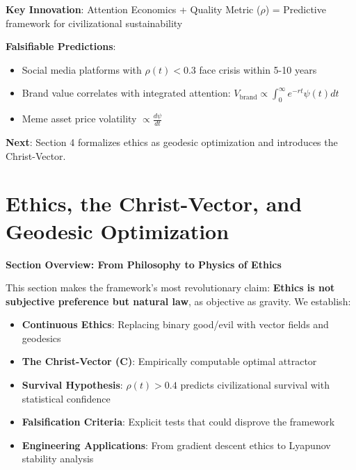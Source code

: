 \documentclass[11pt,a4paper]{article}
\theoremstyle{definition}
\theoremstyle{remark}
\begin{document}
\begin{small}
\begin{mdframed}[backgroundcolor=green!10,linewidth=2pt,linecolor=green!70!black]
\textbf{Key Innovation}:
Attention Economics + Quality Metric (\(\rho\)) = Predictive framework for civilizational sustainability

\textbf{Falsifiable Predictions}:
\begin{itemize}[nosep]
    \item Social media platforms with \(\rho(t) < 0.3\) face crisis within 5-10 years
    \item Brand value correlates with integrated attention: \(V_{\text{brand}} \propto \int_0^\infty e^{-rt} \psi(t) dt\)
    \item Meme asset price volatility \(\propto \frac{d\psi}{dt}\)
\end{itemize}

\textbf{Next}: Section 4 formalizes ethics as geodesic optimization and introduces the Christ-Vector.
\end{mdframed}


\section{Ethics, the Christ-Vector, and Geodesic Optimization}

\begin{mdframed}[backgroundcolor=cyan!5,linewidth=2pt]
\textbf{Section Overview: From Philosophy to Physics of Ethics}

This section makes the framework's most revolutionary claim: \textbf{Ethics is not subjective preference but natural law}, as objective as gravity. We establish:

\begin{itemize}[nosep]
    \item \textbf{Continuous Ethics}: Replacing binary good/evil with vector fields and geodesics
    \item \textbf{The Christ-Vector (\(\mathbf{C}\))}: Empirically computable optimal attractor
    \item \textbf{Survival Hypothesis}: \(\rho(t) > 0.4\) predicts civilizational survival with statistical confidence
    \item \textbf{Falsification Criteria}: Explicit tests that could disprove the framework
    \item \textbf{Engineering Applications}: From gradient descent ethics to Lyapunov stability analysis
\end{itemize}


\end{mdframed}
\end{small}
\end{document}
